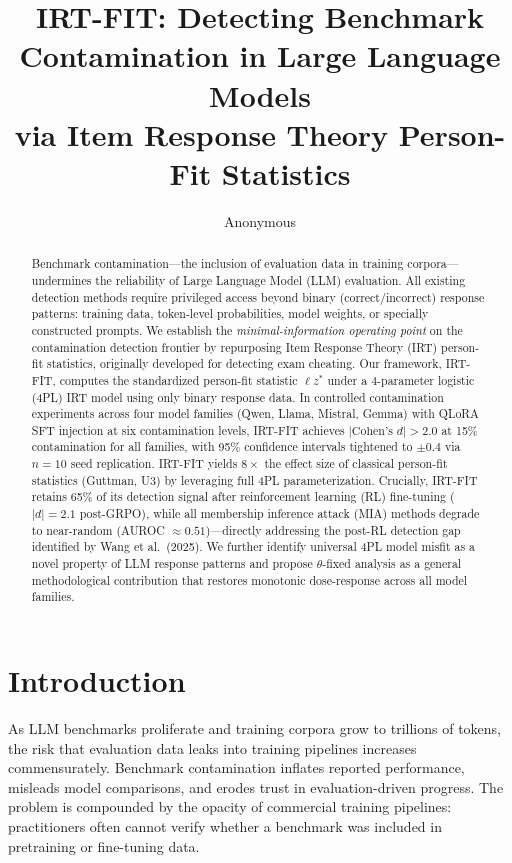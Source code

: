 \documentclass[11pt,a4paper]{article}
\title{\textbf{IRT-FIT: Detecting Benchmark Contamination in Large Language Models\\via Item Response Theory Person-Fit Statistics}}
\author{Anonymous}
\date{}
\begin{document}
\maketitle

\begin{abstract}
Benchmark contamination---the inclusion of evaluation data in training corpora---undermines the reliability of Large Language Model (LLM) evaluation.
All existing detection methods require privileged access beyond binary (correct/incorrect) response patterns: training data, token-level probabilities, model weights, or specially constructed prompts.
We establish the \emph{minimal-information operating point} on the contamination detection frontier by repurposing Item Response Theory (IRT) person-fit statistics, originally developed for detecting exam cheating.
Our framework, IRT-FIT, computes the standardized person-fit statistic $\ell z^*$ under a 4-parameter logistic (4PL) IRT model using only binary response data.
In controlled contamination experiments across four model families (Qwen, Llama, Mistral, Gemma) with QLoRA SFT injection at six contamination levels, IRT-FIT achieves $|\text{Cohen's } d| > 2.0$ at 15\% contamination for all families, with 95\% confidence intervals tightened to $\pm 0.4$ via $n{=}10$ seed replication.
IRT-FIT yields $8\times$ the effect size of classical person-fit statistics (Guttman, U3) by leveraging full 4PL parameterization.
Crucially, IRT-FIT retains 65\% of its detection signal after reinforcement learning (RL) fine-tuning ($|d|{=}2.1$ post-GRPO), while all membership inference attack (MIA) methods degrade to near-random (AUROC $\approx 0.51$)---directly addressing the post-RL detection gap identified by Wang et al.\ (2025).
We further identify universal 4PL model misfit as a novel property of LLM response patterns and propose $\theta$-fixed analysis as a general methodological contribution that restores monotonic dose-response across all model families.
\end{abstract}

\section{Introduction}

As LLM benchmarks proliferate and training corpora grow to trillions of tokens, the risk that evaluation data leaks into training pipelines increases commensurately.
Benchmark contamination inflates reported performance, misleads model comparisons, and erodes trust in evaluation-driven progress.
The problem is compounded by the opacity of commercial training pipelines: practitioners often cannot verify whether a benchmark was included in pretraining or fine-tuning data.
\end{document}

